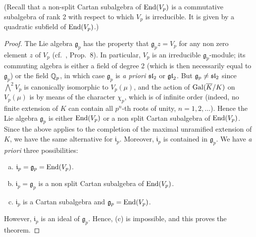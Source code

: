 \begin{subappendices}
(Recall that a non-split Cartan subalgebra of $\operatorname{End}(V_p)$ is a commutative
subalgebra of rank 2 with respect to which $V_p$ is irreducible. It is given by
a quadratic subfield of $\operatorname{End}(V_p)$.)
\begin{proof}
	The Lie algebra $\mathfrak{g}_p$ has the property that $\mathfrak{g}_p
	z = V_p$ for any non zero element $z$ of $V_p$ (cf.\ \cite[128]{27},
	Prop.~8). In particular, $V_p$ is an irreducible
	$\mathfrak{g}_p$-module; its commuting algebra is either a field of
	degree 2 (which is then necessarily equal to $\mathfrak{g}_p$) or the
	\dpage
	field $\mathbb{Q}_p$, in which case $\mathfrak{g}_p$ is \emph{a priori} $\operatorname{\mathfrak{sl}}_2$
	or $\operatorname{\mathfrak{gl}}_2$. But $\mathfrak{g}_p \ne \operatorname{\mathfrak{sl}}_2$ since $\bigwedge^2 V_p$ is
	canonically isomorphic to $V_p(\mu)$, and the action of $\operatorname{Gal}(\overline{K}/K)$ on $V_p(\mu)$ is by means of the character $\chi_p$, which is of
	infinite order (indeed, no finite extension of $K$ can contain all
	$p^n$-th roots of unity, $n = 1, 2, \dots$). Hence the Lie algebra
	$\mathfrak{g}_p$ is either $\operatorname{End}(V_p)$ or a non split Cartan subalgebra
	of $\operatorname{End}(V_p)$. Since the above applies to the completion of the
	maximal unramified extension of $K$, we have the same alternative for
	$\mathfrak{i}_p$. Moreover, $\mathfrak{i}_p$ is contained in
	$\mathfrak{g}_p$. We have \emph{a priori} three possibilities:
	\begin{enumerate}[(a)]
		\item $\mathfrak{i}_p = \mathfrak{g}_p = \operatorname{End}(V_p)$.
		\item $\mathfrak{i}_p = \mathfrak{g}_p$ is a non split Cartan
			subalgebra of $\operatorname{End}(V_p)$.
		\item $\mathfrak{i}_p$ is a Cartan subalgebra and
			$\mathfrak{g}_p = \operatorname{End}(V_p)$.
	\end{enumerate}
	However, $\mathfrak{i}_p$ is an ideal of $\mathfrak{g}_p$. Hence, (c)
	is impossible, and this proves the theorem.
\end{proof}


\end{subappendices}
